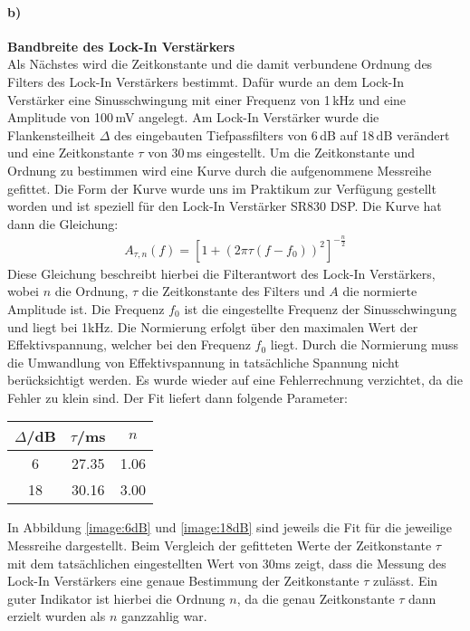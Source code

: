 \paragraph{b)}\textbf{Bandbreite des Lock-In Verstärkers}\\
Als Nächstes wird die Zeitkonstante und die damit verbundene Ordnung des Filters des Lock-In Verstärkers bestimmt. Dafür wurde an dem Lock-In Verstärker eine Sinusschwingung mit einer Frequenz von 1\,kHz und eine Amplitude von 100\,mV angelegt. Am Lock-In Verstärker wurde die Flankensteilheit $\Delta$ des eingebauten Tiefpassfilters von 6\,dB auf 18\,dB verändert und eine Zeitkonstante $\tau$ von 30\,ms eingestellt. Um die Zeitkonstante und Ordnung zu bestimmen wird eine Kurve durch die aufgenommene Messreihe gefittet. Die Form der Kurve wurde uns im Praktikum zur Verfügung gestellt worden und ist speziell für den Lock-In Verstärker SR830 DSP. Die Kurve hat dann die Gleichung:
\begin{gather}
    A_{\tau,n}(f) = \left[1 + (2\pi\tau(f-f_0))^2\right]^{-\frac{n}{2}}
\end{gather}
Diese Gleichung beschreibt hierbei die Filterantwort des Lock-In Verstärkers, wobei \newline $n$ die Ordnung, $\tau$ die Zeitkonstante des Filters und $A$ die normierte Amplitude ist. Die Frequenz $f_0$ ist die eingestellte Frequenz der Sinusschwingung und liegt bei 1kHz. Die Normierung erfolgt über den maximalen Wert der Effektivspannung, welcher bei den Frequenz $f_0$ liegt. Durch die Normierung muss die Umwandlung von Effektivspannung in tatsächliche Spannung nicht berücksichtigt werden. Es wurde wieder auf eine Fehlerrechnung verzichtet, da die Fehler zu klein sind. Der Fit liefert dann folgende Parameter:
\begin{center}
    \begin{tabular}{c | c c}
        $\Delta$/dB & $\tau$/ms & $n$\\
        \hline
        6 & 27.35 & 1.06 \\
        18 & 30.16 & 3.00 \\
    \end{tabular}
    \label{tab:fitPara}
\end{center}
In Abbildung \ref{image:6dB} und \ref{image:18dB} sind jeweils die Fit für die jeweilige Messreihe dargestellt. Beim Vergleich der gefitteten Werte der Zeitkonstante $\tau$ mit dem tatsächlichen eingestellten Wert von 30ms zeigt, dass die Messung des Lock-In Verstärkers eine genaue Bestimmung der Zeitkonstante $\tau$ zulässt. Ein guter Indikator ist hierbei die Ordnung $n$, da die genau Zeitkonstante $\tau$ dann erzielt wurden als $n$ ganzzahlig war.

